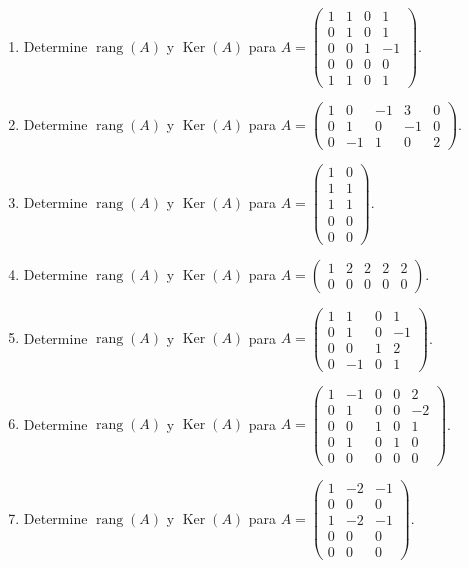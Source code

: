 \documentclass[12pt]{article}
\theoremstyle{remark}
\newcommand{\rang}{\operatorname{rang}}
\newcommand{\Ker}{\operatorname{Ker}}
\newcounter{contadorEjercicio}
\newenvironment{listaejercicios}{\begin{enumerate}[label=\textbf{E\arabic*.},leftmargin=2.4em,itemsep=0.52em]\setcounter{enumi}{\value{contadorEjercicio}}}{\setcounter{contadorEjercicio}{\value{enumi}}\end{enumerate}}
\begin{document}
\begin{listaejercicios}
\item Determine $\rang(A)$ y $\Ker(A)$ para $A=\begin{pmatrix}1&1&0&1\\0&1&0&1\\0&0&1&-1\\0&0&0&0\\1&1&0&1\end{pmatrix}$.

\item Determine $\rang(A)$ y $\Ker(A)$ para $A=\begin{pmatrix}1&0&-1&3&0\\0&1&0&-1&0\\0&-1&1&0&2\end{pmatrix}$.

\item Determine $\rang(A)$ y $\Ker(A)$ para $A=\begin{pmatrix}1&0\\1&1\\1&1\\0&0\\0&0\end{pmatrix}$.

\item Determine $\rang(A)$ y $\Ker(A)$ para $A=\begin{pmatrix}1&2&2&2&2\\0&0&0&0&0\end{pmatrix}$.

\item Determine $\rang(A)$ y $\Ker(A)$ para $A=\begin{pmatrix}1&1&0&1\\0&1&0&-1\\0&0&1&2\\0&-1&0&1\end{pmatrix}$.

\item Determine $\rang(A)$ y $\Ker(A)$ para $A=\begin{pmatrix}1&-1&0&0&2\\0&1&0&0&-2\\0&0&1&0&1\\0&1&0&1&0\\0&0&0&0&0\end{pmatrix}$.

\item Determine $\rang(A)$ y $\Ker(A)$ para $A=\begin{pmatrix}1&-2&-1\\0&0&0\\1&-2&-1\\0&0&0\\0&0&0\end{pmatrix}$.


\end{listaejercicios}
\end{document}
